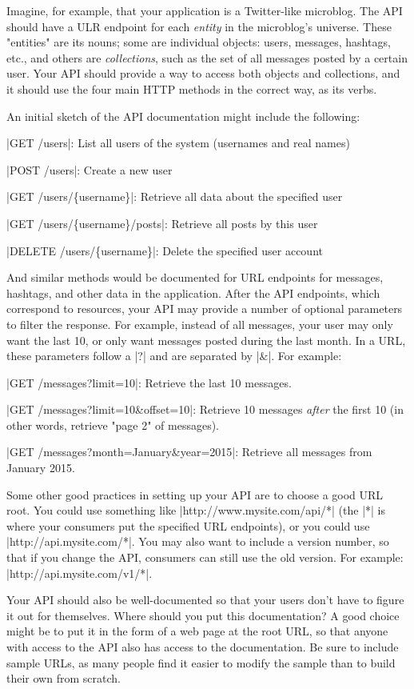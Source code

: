 \documentclass[11pt]{book}
\newcommand{\term}[1]{\emph{#1}} %
\begin{document}
Imagine, for example, that your application is a Twitter-like microblog.  The API should have a ULR endpoint for each \term{entity} in the microblog's universe.  These "entities" are its nouns; some are individual objects: users, messages, hashtags, etc., and others are \term{collections}, such as the set of all messages posted by a certain user.  Your API should provide a way to access both objects and collections, and it should use the four main HTTP methods in the correct way, as its verbs.

An initial sketch of the API documentation might include the following:

|GET /users|: List all users of the system (usernames and real names)

|POST /users|: Create a new user

|GET /users/\{username\}|: Retrieve all data about the specified user

|GET /users/\{username\}/posts|: Retrieve all posts by this user

|DELETE /users/\{username\}|: Delete the specified user account

And similar methods would be documented for URL endpoints for messages, hashtags, and other data in the application.  After the API endpoints, which correspond to resources, your API may provide a number of optional parameters to filter the response.  For example, instead of all messages, your user may only want the last 10, or only want messages posted during the last month.  In a URL, these parameters follow a |?| and are separated by |&|.  For example:

|GET /messages?limit=10|: Retrieve the last 10 messages.

|GET /messages?limit=10\&offset=10|: Retrieve 10 messages \emph{after} the first 10 (in other words, retrieve "page 2" of messages).

|GET /messages?month=January\&year=2015|: Retrieve all messages from January 2015.

Some other good practices in setting up your API are to choose a good URL root.  You could use something like |http://www.mysite.com/api/*| (the |*| is where your consumers put the  specified URL endpoints), or you could use |http://api.mysite.com/*|.  You may also want to include a version number, so that if you change the API, consumers can still use the old version.  For example: |http://api.mysite.com/v1/*|.

Your API should also be well-documented so that your users don't have to figure it out for themselves.  Where should you put this documentation?  A good choice might be to put it in the form of a web page at the root URL, so that anyone with access to the API also has access to the documentation.  Be sure to include sample URLs, as many people find it easier to modify the sample than to build their own from scratch.
\end{document}
